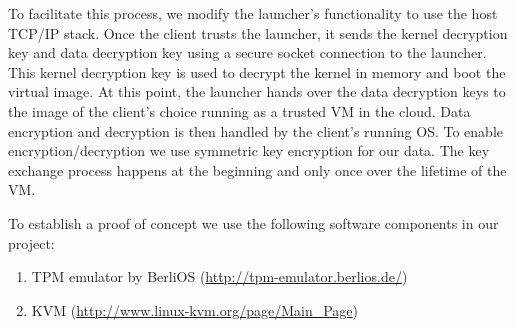\documentclass[11pt,pdftex]{article}
\begin{document}
To facilitate this process, we modify the launcher's functionality to use the host TCP/IP stack. Once the client trusts the launcher, it sends the kernel decryption key and data decryption key using a secure socket connection to the launcher. This kernel decryption key is used to decrypt the kernel in memory and boot the virtual image. At this point, the launcher hands over the data decryption keys to the image of the client's choice running as a trusted VM in the cloud. Data encryption and decryption is then handled by the client's running OS. To enable encryption/decryption we use symmetric key encryption for our data. The key exchange process happens at the beginning and only once over the lifetime of the VM.

To establish a proof of concept we use the following software components in our project:
\begin{enumerate}
\item TPM emulator by BerliOS (\url{http://tpm-emulator.berlios.de/})
\item KVM (\url{http://www.linux-kvm.org/page/Main_Page})
\end{enumerate}
\end{document}
